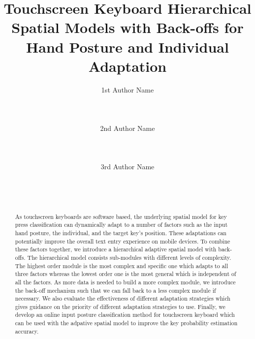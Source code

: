 \documentclass{sigchi}
\begin{document}
\title{Touchscreen Keyboard Hierarchical Spatial Models with Back-offs for
Hand Posture and Individual Adaptation}

\author{
  \alignauthor 1st Author Name\\
    \\
    \\
    \\
  \alignauthor 2nd Author Name\\
    \\
    \\
    \\
  \alignauthor 3rd Author Name\\
    \\
    \\
    \\
}


\maketitle

\begin{abstract}
As touchscreen keyboards are software based, the underlying spatial model for key press
classification can dynamically adapt to a number of factors such as the input 
hand posture, the individual, and the target key's position. These adaptations can
potentially improve the overall text entry experience on mobile devices. To 
combine these factors together, we introduce a hierarchical adaptive spatial 
model with back-offs. The hierarchical model consists sub-modules with different levels of
complexity. The highest order module is the most complex and specific one which adapts to 
all three factors whereas the lowest order one is the most general which is independent
of all the factors. As more data is needed to build a more complex module, we introduce
the back-off mechanism such that we can fall back to a less complex module if necessary.
We also evaluate the effectiveness of different adaptation strategies which gives 
guidance on the priority of different adaptation strategies to use. Finally, we
develop an online input posture classification method for touchscreen keyboard which can be
used with the adpative spatial model to improve the key probability estimation accuracy.
 
\end{abstract}
\end{document}
